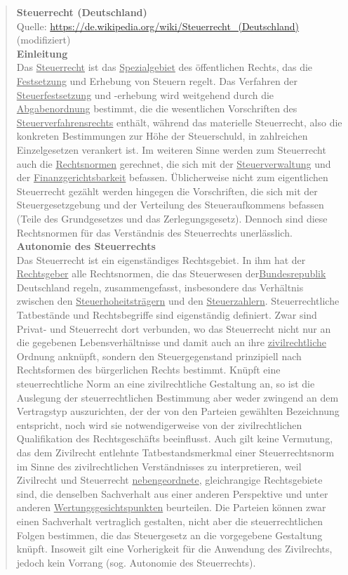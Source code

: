 \aufgabeginn
\begin{quote}
  \textbf{Steuerrecht (Deutschland)}\\
  {\footnotesize Quelle: \url{https://de.wikipedia.org/wiki/Steuerrecht_(Deutschland)} (modifiziert)}\\

  \textbf{Einleitung}\\
  Das \aufg\ul{Steuerrecht} ist das \aufg\ul{Spezialgebiet} des öffentlichen Rechts, das die \aufg\ul{Festsetzung} und Erhebung von Steuern regelt. Das Verfahren der \aufg\ul{Steuerfestsetzung} und -erhebung wird weitgehend durch die \aufg\ul{Abgabenordnung} bestimmt, die die wesentlichen Vorschriften des \aufg\ul{Steuerverfahrensrechts} enthält, während das materielle Steuerrecht, also die konkreten Bestimmungen zur Höhe der Steuerschuld, in zahlreichen Einzelgesetzen verankert ist. Im weiteren Sinne werden zum Steuerrecht auch die \aufg\ul{Rechtsnormen} gerechnet, die sich mit der \aufg\ul{Steuerverwaltung} und der \aufg\ul{Finanzgerichtsbarkeit} befassen. Üblicherweise nicht zum eigentlichen Steuerrecht gezählt werden hingegen die Vorschriften, die sich mit der Steuergesetzgebung und der Verteilung des Steueraufkommens befassen (Teile des Grundgesetzes und das Zerlegungsgesetz). Dennoch sind diese Rechtsnormen für das Verständnis des Steuerrechts unerlässlich.\\

  \textbf{Autonomie des Steuerrechts}\\
  Das Steuerrecht ist ein eigenständiges Rechtsgebiet. In ihm hat der \aufg\ul{Rechtsgeber} alle Rechtsnormen, die das Steuerwesen der\aufg\ul{Bundesrepublik} Deutschland regeln, zusammengefasst, insbesondere das Verhältnis zwischen den \aufg\ul{Steuerhoheitsträgern} und den \aufg\ul{Steuerzahlern}. Steuerrechtliche Tatbestände und Rechtsbegriffe sind eigenständig definiert. Zwar sind Privat- und Steuerrecht dort verbunden, wo das Steuerrecht nicht nur an die gegebenen Lebensverhältnisse und damit auch an ihre \aufg\ul{zivilrechtliche} Ordnung anknüpft, sondern den Steuergegenstand prinzipiell nach Rechtsformen des bürgerlichen Rechts bestimmt. Knüpft eine steuerrechtliche Norm an eine zivilrechtliche Gestaltung an, so ist die Auslegung der steuerrechtlichen Bestimmung aber weder zwingend an dem Vertragstyp auszurichten, der der von den Parteien gewählten Bezeichnung entspricht, noch wird sie notwendigerweise von der zivilrechtlichen Qualifikation des Rechtsgeschäfts beeinflusst. Auch gilt keine Vermutung, das dem Zivilrecht entlehnte Tatbestandsmerkmal einer Steuerrechtsnorm im Sinne des zivilrechtlichen Verständnisses zu interpretieren, weil Zivilrecht und Steuerrecht \aufg\ul{nebengeordnete}, gleichrangige Rechtsgebiete sind, die denselben Sachverhalt aus einer anderen Perspektive und unter anderen \aufg\ul{Wertungsgesichtspunkten} beurteilen. Die Parteien können zwar einen Sachverhalt vertraglich gestalten, nicht aber die steuerrechtlichen Folgen bestimmen, die das Steuergesetz an die vorgegebene Gestaltung knüpft. Insoweit gilt eine Vorherigkeit für die Anwendung des Zivilrechts, jedoch kein Vorrang (sog. Autonomie des Steuerrechts).
\end{quote}


